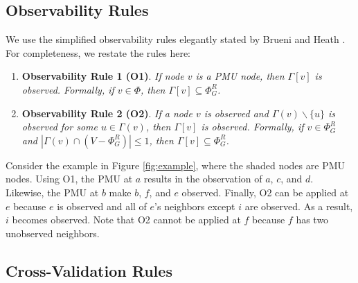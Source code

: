 \subsection{Observability Rules}
\label{subsec:observe}

We use the simplified observability rules elegantly stated by Brueni and Heath \cite{Brueni05}. For completeness, we restate the rules here:
\begin{enumerate}
	
	\item {\bf Observability Rule 1 (O1)}.  {\it If  node $v$ is a PMU node, then $\Gamma[v]$ is observed. Formally, if $v \in \Phi$, then $\Gamma[v] \subseteq \Phi^R_G$. }

	\item {\bf Observability Rule 2 (O2)}. {\it If a node $v$ is observed and  $\Gamma(v)\backslash\{u\}$ is observed for some $u\in\Gamma(v)$, then  $\Gamma[v]$ is observed.
	Formally, if $v \in \Phi^R_G$ and $|\Gamma(v) \cap (V - \Phi^R_G)| \leq 1$, then $\Gamma[v] \subseteq \Phi^R_G$. }

\end{enumerate}

Consider the example in Figure \ref{fig:example}, where the shaded nodes are  PMU nodes.
Using O1, the PMU at $a$ results in the observation of $a$, $c$, and $d$. Likewise, the PMU at $b$ make $b$, $f$, and $e$ observed.
Finally, O2 can be applied at $e$ because $e$ is observed and all of $e$'s neighbors except $i$ are observed. As a result, $i$ becomes observed. 
Note that O2 cannot be applied at $f$ because $f$ has two unobserved neighbors. %





\subsection{Cross-Validation Rules}
\label{subsec:xval}

